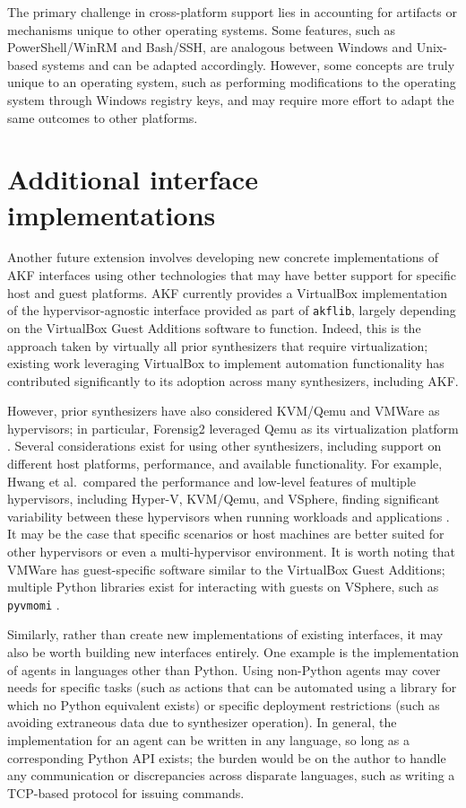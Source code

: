 The primary challenge in cross-platform support lies in accounting for
artifacts or mechanisms unique to other operating systems. Some
features, such as PowerShell/WinRM and Bash/SSH, are analogous between
Windows and Unix-based systems and can be adapted accordingly. However,
some concepts are truly unique to an operating system, such as
performing modifications to the operating system through Windows
registry keys, and may require more effort to adapt the same outcomes to
other platforms.

\section{Additional interface
implementations}\label{additional-interface-implementations}

Another future extension involves developing new concrete
implementations of AKF interfaces using other technologies that may have
better support for specific host and guest platforms. AKF currently
provides a VirtualBox implementation of the hypervisor-agnostic
interface provided as part of \passthrough{\lstinline!akflib!}, largely
depending on the VirtualBox Guest Additions software to function.
Indeed, this is the approach taken by virtually all prior synthesizers
that require virtualization; existing work leveraging VirtualBox to
implement automation functionality has contributed significantly to its
adoption across many synthesizers, including AKF.

However, prior synthesizers have also considered KVM/Qemu and VMWare as
hypervisors; in particular, Forensig2 leveraged Qemu as its
virtualization platform \cite{mochForensicImageGenerator2009}.
Several considerations exist for using other synthesizers, including
support on different host platforms, performance, and available
functionality. For example, Hwang et al.~compared the performance and
low-level features of multiple hypervisors, including Hyper-V, KVM/Qemu,
and VSphere, finding significant variability between these hypervisors
when running workloads and applications
\cite{hwangComponentbasedPerformanceComparison2013}. It may be the
case that specific scenarios or host machines are better suited for
other hypervisors or even a multi-hypervisor environment. It is worth
noting that VMWare has guest-specific software similar to the VirtualBox
Guest Additions; multiple Python libraries exist for interacting with
guests on VSphere, such as \passthrough{\lstinline!pyvmomi!}
\cite{VmwarePyvmomi2025}.

Similarly, rather than create new implementations of existing
interfaces, it may also be worth building new interfaces entirely. One
example is the implementation of agents in languages other than Python.
Using non-Python agents may cover needs for specific tasks (such as
actions that can be automated using a library for which no Python
equivalent exists) or specific deployment restrictions (such as avoiding
extraneous data due to synthesizer operation). In general, the
implementation for an agent can be written in any language, so long as a
corresponding Python API exists; the burden would be on the author to
handle any communication or discrepancies across disparate languages,
such as writing a TCP-based protocol for issuing commands.

